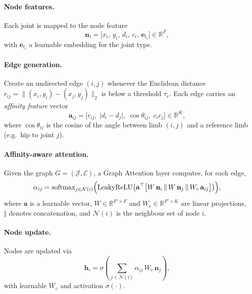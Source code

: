 \paragraph{Node features.}
Each joint is mapped to the node feature
\begin{equation}
\mathbf{n}_i
  =\bigl[x_i,\,y_i,\,d_i,\,c_i,\,\mathbf{e}_{t_i}\bigr]
  \in\mathbb{R}^{F},
\label{eq:node_feature}
\end{equation}
with \(\mathbf{e}_{t_i}\) a learnable embedding for the joint type.

\paragraph{Edge generation.}
Create an undirected edge \((i,j)\) whenever the Euclidean distance
\(r_{ij}=\lVert(x_i,y_i)-(x_j,y_j)\rVert_2\) is below a threshold \(\tau_r\).
Each edge carries an \emph{affinity feature} vector
\begin{equation}
\mathbf{a}_{ij}
  =\bigl[r_{ij},\;\lvert d_i-d_j\rvert,\;
          \cos\theta_{ij},\;
          c_i c_j\bigr]
  \in\mathbb{R}^{K},
\label{eq:affinity_vector}
\end{equation}
where \(\cos\theta_{ij}\) is the cosine of the angle between limb \((i,j)\)
and a reference limb (e.g.\ hip to joint \(j\)).

\paragraph{Affinity-aware attention.}
Given the graph \(G=(\mathcal{J},\mathcal{E})\),
a Graph Attention layer computes, for each edge,
\begin{equation}
\alpha_{ij}
  =\operatorname{softmax}_{j\in\mathcal{N}(i)}
     \Bigl(
       \mathrm{LeakyReLU}\bigl(
         \mathbf{a}^{\top}
         \bigl[
           W\,\mathbf{n}_i
           \,\Vert\,
           W\,\mathbf{n}_j
           \,\Vert\,
           W_e\,\mathbf{a}_{ij}
         \bigr]
       \bigr)
     \Bigr),
\label{eq:affinity_coef}
\end{equation}
where \(\mathbf{a}\) is a learnable vector,
\(W\in\mathbb{R}^{F'\!\times F}\) and
\(W_e\in\mathbb{R}^{F'\!\times K}\) are linear projections,
\(\Vert\) denotes concatenation,
and \(\mathcal{N}(i)\) is the neighbour set of node \(i\).

\paragraph{Node update.}
Nodes are updated via
\begin{equation}
\mathbf{h}_i
  =\sigma\!\left(
      \sum_{j\in\mathcal{N}(i)}
        \alpha_{ij}\,W_v\,\mathbf{n}_j
    \right),
\label{eq:node_update}
\end{equation}
with learnable \(W_v\) and activation \(\sigma(\cdot)\).

